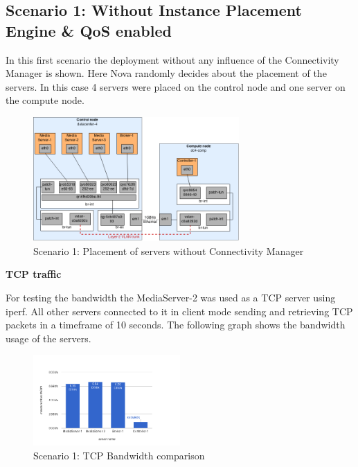 \subsection{Scenario 1: Without Instance Placement Engine \& QoS enabled}

In this first scenario the deployment without any influence of the Connectivity Manager is shown. Here Nova randomly decides about the placement of the servers. In this case 4 servers were placed on the control node and one server on the compute node.

\begin{figure}[H]
\centering

\includegraphics[width=0.7\textwidth]{images/evaluation/testbed_scenario1}

\caption{Scenario 1: Placement of servers without Connectivity Manager}
\end{figure}

\textbf{TCP traffic}

For testing the bandwidth the MediaServer-2 was used as a TCP server using iperf. All other servers connected to it in client mode sending and retrieving TCP packets in a timeframe of 10 seconds. The following graph shows the bandwidth usage of the servers.

\begin{figure}[H]
\centering

\includegraphics[width=0.5\textwidth]{images/evaluation/testbed_scenario1_bw}

\caption{Scenario 1: TCP Bandwidth comparison}
\end{figure}

